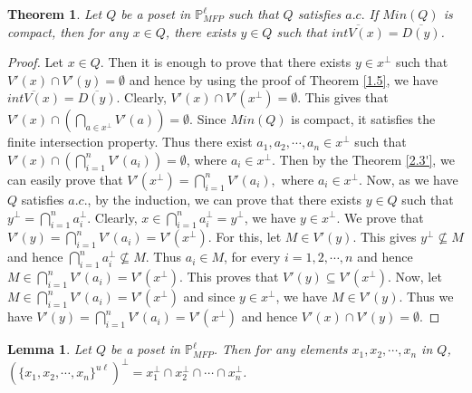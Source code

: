 \documentclass[10pt,one side,emlines]{amsart}
\newtheorem{lemma}[lem]{Lemma}
\newtheorem{thm}[lem]{Theorem}
\theoremstyle{definition}
\begin{document}
\begin{thm}\label{1.13} Let $Q$ be a poset in $\mathbb{P}^{\ell}_{MFP}$ such that $Q$ satisfies $a.c.$ If $Min(Q)$ is compact, then for any $x\in Q$, there exists $y\in Q$ such that $\overline{int V(x)} = \overline{D(y)}$.
\end{thm}
\begin{proof} Let $x\in Q$. Then it is enough to prove that there exists $y\in x^{\perp}$ such that $V'(x)\cap V'(y)=\emptyset $ and hence by using the proof of Theorem \ref{1.5}, we have $\overline{int V(x)} = \overline{D(y)}$. Clearly, $V'(x)\cap V'(x^{\perp})=\emptyset$. This gives that $V'(x)\cap (\bigcap _{a\in x^{\perp}}V'(a))= \emptyset $. Since $Min(Q)$ is compact, it satisfies the finite intersection property. Thus there exist $a_{1}, a_{2},\cdots ,a_{n}\in x^{\perp}$ such that $V'(x)\cap (\bigcap _{i=1}^{n}V'(a_i))= \emptyset $, where $a_i \in x^{\perp}$. Then by the Theorem \ref{2.3'}, we can easily prove that $V'(x^{\perp})=\bigcap _{i=1}^{n}V'(a_i), $  where $a_i \in x^{\perp}$. Now, as we have $Q$ satisfies $a.c.$, by the induction, we can prove that there exists $y\in Q$ such that  $y^{\perp}= \bigcap _{i=1}^{n} a_i^{\perp}$. Clearly, $x\in  \bigcap _{i=1}^{n} a_i^{\perp} = y^{\perp}$, we have $y\in x^{\perp}$. We prove that $V'(y)=\bigcap _{i=1}^{n}V'(a_i)=V'(x^{\perp})$. For this, let $M\in V'(y)$. This gives $y^{\perp}\not \subseteq M $ and hence $\bigcap _{i=1}^{n} a_i^{\perp} \not \subseteq M$. Thus  $a_{i}\in M$, for every $i=1,2,\cdots, n$ and hence $M\in \bigcap _{i=1}^{n}V'(a_i)=V'(x^{\perp})$. This proves that $V'(y)\subseteq V'(x^{\perp})$. Now, let $M\in \bigcap _{i=1}^{n}V'(a_i)=V'(x^{\perp})$ and since $y\in x^{\perp}$, we have $M\in V'(y)$. Thus we have $V'(y)=\bigcap _{i=1}^{n}V'(a_i)=V'(x^{\perp})$ and hence $V'(x)\cap V'(y)=\emptyset$. 
\end{proof}

\begin{lemma}\label{1.16} Let $Q$ be a poset in $\mathbb{P}^{\ell}_{MFP}$. Then for any elements $x_1,x_2,\cdots ,x_n$ in $Q$, \linebreak $(\{x_1,x_2,\cdots , x_n\}^{u\ell})^{\perp }=x_1^{\perp }\cap x_2^{\perp }\cap \cdots \cap x_n^{\perp }$.\end{lemma}
\end{document}
